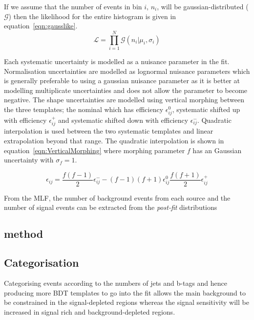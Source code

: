 If we assume that the number of events in bin $i$, $n_{i}$, will be gaussian-distributed ($\mathcal{G}$) then the likelihood for the entire histogram is given in equation~\ref{eqn:gausslike}.
\begin{equation}
\mathcal{L} = \prod_{i=1}^{N} \mathcal{G}\left(n_{i}|\mu_{i},\sigma_{i}\right)
\label{eqn:gausslike}
\end{equation}

Each systematic uncertainty is modelled as a nuisance parameter in the fit. Normalisation uncertainties are modelled as lognormal nuisance parameters which is generally preferable to using a gaussian nuisance parameter as it is better at modelling multiplicate uncertainties and does not allow the parameter to become negative. The shape uncertainties are modelled using vertical morphing between the three templates; the nominal which has efficiency $\epsilon_{ij}^{0}$, systematic shifted up with efficiency $\epsilon_{ij}^{+}$ and systematic shifted down with efficiency $\epsilon_{ij}^{-}$. Quadratic interpolation is used between the two systematic templates and linear extrapolation beyond that range. The quadratic interpolation is shown in equation~\ref{eqn:VerticalMorphing} where morphing parameter $f$ has an Gaussian uncertainty with $\sigma_{f}=1$.

\begin{equation}
\epsilon_{ij} = \frac{f\left(f-1\right)}{2}\epsilon_{ij}^{-} - \left(f-1\right)\left(f+1\right) \epsilon_{ij}^{0}  \frac{f\left(f+1\right)}{2}\epsilon_{ij}^{+}
\label{eqn:VerticalMorphing}
\end{equation}

From the MLF, the number of background events from each source and the number of signal events can be extracted from the \emph{post-fit} distributions

\subsection{\CLS method}




\subsection{Categorisation}
\label{sec:Cats}

Categorising events according to the numbers of jets and b-tags and hence producing more BDT templates to go into the fit allows the main \ttbar background to be constrained in the signal-depleted regions whereas the signal sensitivity will be increased in signal rich and background-depleted regions.


